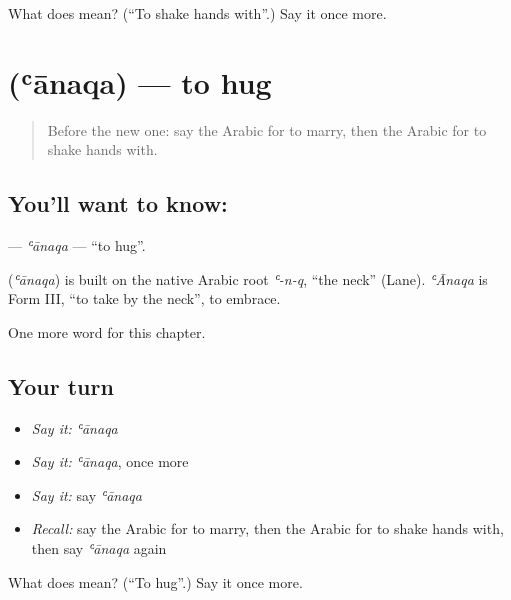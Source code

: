\begin{tcolorbox}[breakable,colback=teal!4,colframe=teal!35!black,title={Before you move on}]
What does  mean? (\textquotedblleft{}To shake hands with\textquotedblright{}.) Say it once more.
\end{tcolorbox}
\section[\texorpdfstring{\ar{عانق} (ʿānaqa)}{عانق (ʿānaqa)}]{ (ʿānaqa) — to hug}

\label{lesson:AR-C163-anaqa}



\begin{quote}
Before the new one: say the Arabic for to marry, then the Arabic for to shake hands with.
\end{quote}

\subsection*{You'll want to know: }
\textbf{} — \emph{ʿānaqa} — \textquotedblleft{}to hug\textquotedblright{}.

\begin{cousinweb}
\textbf{} (\emph{ʿānaqa}) is built on the native Arabic root \emph{ʿ-n-q}, \textquotedblleft{}the neck\textquotedblright{} (Lane). \emph{ʿĀnaqa} is Form III, \textquotedblleft{}to take by the neck\textquotedblright{}, to embrace.
\end{cousinweb}

\begin{grammarlens}[title={What you've built}]
One more word for this chapter.
\end{grammarlens}

\subsection*{Your turn}
\begin{itemize}
\raggedright
  \item \emph{Say it:} \emph{ʿānaqa}
  \item \emph{Say it:} \emph{ʿānaqa}, once more
  \item \emph{Say it:} say \emph{ʿānaqa}
  \item \emph{Recall:} say the Arabic for to marry, then the Arabic for to shake hands with, then say \emph{ʿānaqa} again
\end{itemize}

\begin{tcolorbox}[breakable,colback=teal!4,colframe=teal!35!black,title={Before you move on}]
What does  mean? (\textquotedblleft{}To hug\textquotedblright{}.) Say it once more.
\end{tcolorbox}
